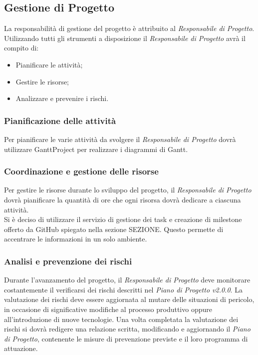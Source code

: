 \subsection{Gestione di Progetto}
La responsabilità di gestione del progetto è attribuito al \textit{Responsabile di Progetto}. \\
Utilizzando tutti gli strumenti a disposizione il \textit{Responsabile di Progetto} avrà il compito di:
\begin{itemize}
	\item Pianificare le attività;
	\item Gestire le risorse;
	\item Analizzare e prevenire i rischi.
\end{itemize}

\subsubsection{Pianificazione delle attività}
Per pianificare le varie attività da svolgere il \textit{Responsabile di Progetto} dovrà utilizzare GanttProject per realizzare i diagrammi di Gantt.

\subsubsection{Coordinazione e gestione delle risorse}
Per gestire le risorse durante lo sviluppo del progetto, il \textit{Responsabile di Progetto} dovrà pianificare la quantità di ore che ogni risorsa dovrà dedicare a ciascuna attività.\\
Si è deciso di utilizzare il servizio di gestione dei \gls{task} e creazione di \gls{milestone} offerto da \gls{GitHub} spiegato nella sezione SEZIONE. Questo permette di accentrare le informazioni in un solo ambiente.

\subsubsection{Analisi e prevenzione dei rischi}
Durante l'avanzamento del progetto, il \textit{Responsabile di Progetto} deve monitorare costantemente il verificarsi dei rischi descritti nel \textit{Piano di Progetto v2.0.0}. La valutazione dei rischi deve essere aggiornata al mutare delle situazioni di pericolo, in occasione di significative modifiche al processo produttivo oppure all'introduzione di nuove tecnologie. Una volta completata la valutazione dei rischi si dovrà redigere una relazione scritta, modificando e aggiornando il \textit{Piano di Progetto}, contenente le misure di prevenzione previste e il loro programma di attuazione.

